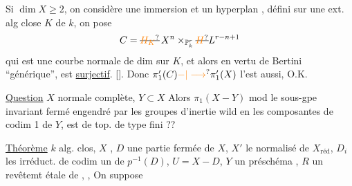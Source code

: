 Si $\dim X\geq 2$, on considère une immersion
et un hyperplan  , défini sur une ext. alg close $K$ de $k$, on pose
\[
 C=\deleted{\unsure{H_{K}}}\,X^n\times_{\mathbb P_k^r}\deleted{\unsure{H}}L^{r-n+1}
\]
qui est une courbe normale de dim  sur $K$, et alors en vertu de Bertini ``générique'',
est \uline{surjectif}. []. Donc $\pi'_1(C)\unsure{-|\longrightarrow}\pi'_1(X)$ l'est aussi, O.K.

\uline{Question} $X$ normale complète, $Y\subset X$  Alors $\pi_1(X-Y)$ mod le sous-gpe invariant fermé engendré par les groupes d'inertie wild en les composantes de  codim 1 de $Y$, est de top. de type fini ??

\uline{Théorème}  $k$ alg. clos, $X$   ,  $D$ une partie fermée de $X$,  $X'$ le normalisé de $X_{\mathrm{réd}}$, $D_i$ les   irréduct. de codim un de $p^{-1}(D)$, $U=X-D$,
 $Y$ un préschéma  ,   $R$ un revêtemt étale de  , , On suppose

